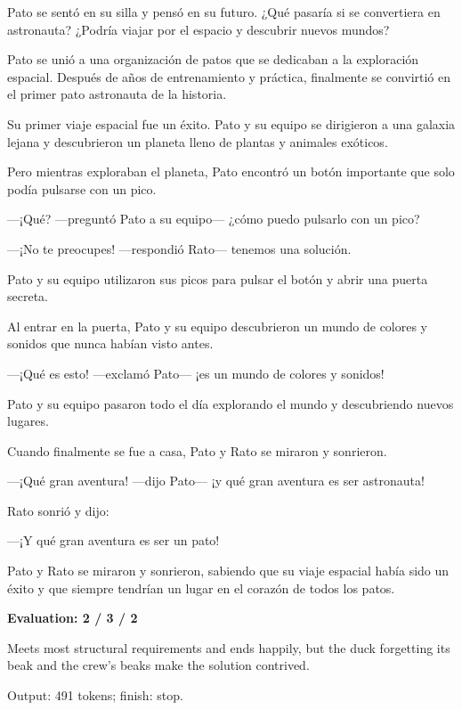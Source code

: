 \documentclass[10pt]{article}
\begin{document}
{\begin{minipage}{\textwidth}
\par\smallskip
Pato se sentó en su silla y pensó en su futuro. ¿Qué pasaría si se convertiera en astronauta? ¿Podría viajar por el espacio y descubrir nuevos mundos?
\par\smallskip
Pato se unió a una organización de patos que se dedicaban a la exploración espacial. Después de años de entrenamiento y práctica, finalmente se convirtió en el primer pato astronauta de la historia.
\par\smallskip
Su primer viaje espacial fue un éxito. Pato y su equipo se dirigieron a una galaxia lejana y descubrieron un planeta lleno de plantas y animales exóticos.
\par\smallskip
Pero mientras exploraban el planeta, Pato encontró un botón importante que solo podía pulsarse con un pico.
\par\smallskip
—¡Qué? —preguntó Pato a su equipo— ¿cómo puedo pulsarlo con un pico?
\par\smallskip
—¡No te preocupes! —respondió Rato— tenemos una solución.
\par\smallskip
Pato y su equipo utilizaron sus picos para pulsar el botón y abrir una puerta secreta.
\par\smallskip
Al entrar en la puerta, Pato y su equipo descubrieron un mundo de colores y sonidos que nunca habían visto antes.
\par\smallskip
—¡Qué es esto! —exclamó Pato— ¡es un mundo de colores y sonidos!
\par\smallskip
Pato y su equipo pasaron todo el día explorando el mundo y descubriendo nuevos lugares.
\par\smallskip
Cuando finalmente se fue a casa, Pato y Rato se miraron y sonrieron.
\par\smallskip
—¡Qué gran aventura! —dijo Pato— ¡y qué gran aventura es ser astronauta!
\par\smallskip
Rato sonrió y dijo:
\par\smallskip
—¡Y qué gran aventura es ser un pato!
\par\smallskip
Pato y Rato se miraron y sonrieron, sabiendo que su viaje espacial había sido un éxito y que siempre tendrían un lugar en el corazón de todos los patos.\par\smallskip
\textbf{Evaluation: 2 / 3 / 2}\par Meets most structural requirements and ends happily, but the duck forgetting its beak and the crew's beaks make the solution contrived.
\par {\color{gray} Output: 491 tokens; finish: stop.}\par

\end{minipage}}
\end{document}
